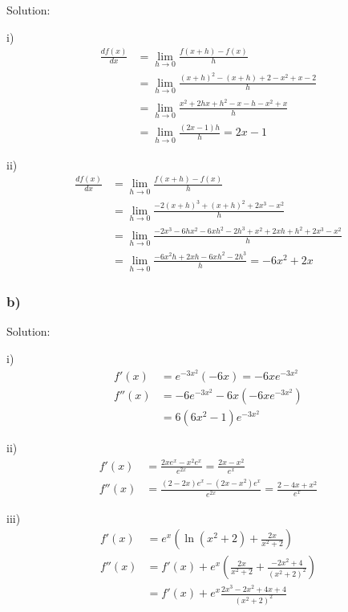 \documentclass[letterpaper, 11pt]{article}
\newcommand{\1}{\mathds{1}}	%
\theoremstyle{definition}
\begin{document}
Solution:

i)
\begin{align*}
  \frac{d f(x)}{dx} &= \lim_{h \to 0} \frac{f(x+h) - f(x)}{h} \\
  &= \lim_{h \to 0} \frac{(x+h)^{2} - (x+h) + 2 - x ^{2} + x -2}{h} \\
  &= \lim_{h \to 0} \frac{x ^{2} + 2hx + h ^{2} - x -h - x ^{2} +x}{h} \\
  &= \lim_{h \to 0} \frac{(2x-1)h}{h} = 2x-1
\end{align*} 

ii)
\begin{align*}
   \frac{d f(x)}{dx} &= \lim_{h \to 0} \frac{f(x+h) - f(x)}{h} \\
  &= \lim_{h \to 0} \frac{-2(x+h)^3 + (x+h) ^{2} + 2x ^{3}  - x ^{2}}{h} \\
  &= \lim_{h \to 0} \frac{-2 x ^{3} - 6hx ^{2} -6xh ^{2} - 2h ^{3} + x ^{2} + 2xh + h ^{2} + 2 x ^{3} - x ^{2}}{h} \\
  &= \lim_{h \to 0} \frac{-6x ^{2} h + 2xh -6 xh ^{2} -2h ^{3}}{h} = -6 x ^{2} + 2x
\end{align*}



\subsubsection*{b)}

Solution:

i)
\begin{align*}
  f'(x) &= e ^{-3x ^{2}} (-6 x) = -6x e ^{-3 x^{2}} \\
  f''(x) &= -6e ^{-3 x^{2}} -6x (-6x e ^{-3 x^{2}}) \\
        &= 6(6x ^{2} - 1) e ^{-3 x ^{2}} 
\end{align*}

ii)
\begin{align*}
  f'(x) &= \frac{2xe^{x} - x ^{2} e ^{x}}{e ^{2x}} = \frac{2x-x ^{2}}{e ^{x}} \\
  f''(x) &= \frac{(2 - 2x)e ^{x}-(2x - x ^{2})e ^{x}}{e ^{2x}} = \frac{2-4x+x ^{2}}{e ^{x}}
\end{align*}

iii)
\begin{align*}
  f'(x) &= e ^{x}(\ln(x ^{2} + 2) + \frac{2x}{x ^{2} + 2}) \\
  f''(x) &= f'(x) + e ^{x} (\frac{2x}{x ^{2} + 2} + \frac{-2x ^{2} + 4}{(x ^{2} + 2)^{2}}) \\
  &= f'(x) + e ^{x}\frac{2x ^{3} -2 x ^{2} + 4x + 4}{(x ^{2} + 2) ^{2}}
\end{align*}
\end{document}

